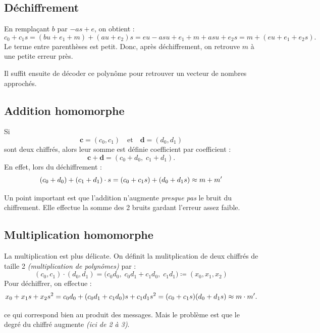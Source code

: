 \documentclass[11pt,a4paper]{article}
\begin{document}
\subsection{Déchiffrement}

En remplaçant $b$ par $-as+e$, on obtient :
\[
c_0 + c_1 s
=
(bu+e_1+m) + (au+e_2)s
=
eu - asu + e_1 + m + asu + e_2s
=
m + (e u + e_1 + e_2 s).
\]
Le terme entre parenthèses est petit. Donc, après déchiffrement, on retrouve $m$ à une petite erreur près.


Il suffit ensuite de décoder ce polynôme pour retrouver un vecteur de nombres approchés.

\subsection{Addition homomorphe}

Si
\[
\mathbf{c}=(c_0,c_1)
\quad\text{et}\quad
\mathbf{d}=(d_0,d_1)
\]
sont deux chiffrés, alors leur somme est définie coefficient par coefficient :
\[
\mathbf{c}+\mathbf{d}=(c_0+d_0,\; c_1+d_1).
\]
En effet, lors du déchiffrement : 
\[
(c_0 + d_0) + (c_1 + d_1) \cdot s
  = (c_0 + c_1 s) + (d_0 + d_1 s) \\
  \approx m + m'
\]

Un point important est que l'addition n'augmente \emph{presque pas} le bruit du chiffrement. Elle effectue la somme des 2 bruits gardant l'erreur assez faible.

\subsection{Multiplication homomorphe}

La multiplication est plus délicate. On définit la mulitplication de deux chiffrés de taille 2 \emph{(multiplication de polynômes)} par :
\[
(c_0,c_1)\cdot(d_0,d_1)
=
\bigl(
c_0d_0,\;
c_0d_1+c_1d_0,\;
c_1d_1
\bigr) \coloneqq (x_0, x_1, x_2)
\] 
Pour déchiffrer, on effectue : 
\[
x_0 + x_1 s + x_2 s^2
  = c_0d_0 + (c_0d_1+c_1d_0)s + c_1d_1s^2
  = (c_0 + c_1 s)(d_0 + d_1 s) \\
  \approx m \cdot m'.
\]

ce qui correspond bien au produit des messages. Mais le problème est que le degré du chiffré augmente \emph{(ici de 2 à 3)}.

\end{document}
